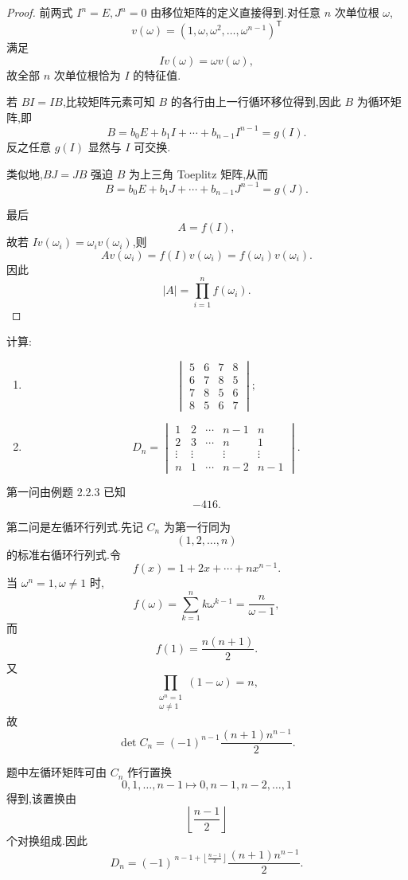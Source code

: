 \begin{proof}
前两式 $I^n=E,J^n=0$ 由移位矩阵的定义直接得到.对任意 $n$ 次单位根 $\omega$,
\[
v(\omega)
=
(1,\omega,\omega^2,\ldots,\omega^{n-1})^{\mathsf T}
\]
满足
\[
Iv(\omega)=\omega v(\omega),
\]
故全部 $n$ 次单位根恰为 $I$ 的特征值.

若 $BI=IB$,比较矩阵元素可知 $B$ 的各行由上一行循环移位得到,因此 $B$ 为循环矩阵,即
\[
B=b_0E+b_1I+\cdots+b_{n-1}I^{n-1}=g(I).
\]
反之任意 $g(I)$ 显然与 $I$ 可交换.

类似地,$BJ=JB$ 强迫 $B$ 为上三角 Toeplitz 矩阵,从而
\[
B=b_0E+b_1J+\cdots+b_{n-1}J^{n-1}=g(J).
\]

最后
\[
A=f(I),
\]
故若 $Iv(\omega_i)=\omega_i v(\omega_i)$,则
\[
Av(\omega_i)
=
f(I)v(\omega_i)
=
f(\omega_i)v(\omega_i).
\]
因此
\[
|A|
=
\prod\limits_{i=1}^{n}f(\omega_i).
\]
\end{proof}


\begin{example}
计算:
\begin{enumerate}
  \item
  \[
  \begin{vmatrix}
  5&6&7&8\\
  6&7&8&5\\
  7&8&5&6\\
  8&5&6&7
  \end{vmatrix};
  \]
  \item
  \[
  D_n=
  \begin{vmatrix}
  1&2&\cdots&n-1&n\\
  2&3&\cdots&n&1\\
  \vdots&\vdots&&\vdots&\vdots\\
  n&1&\cdots&n-2&n-1
  \end{vmatrix}.
  \]
\end{enumerate}
\end{example}
\exampleblank

\begin{solution}
第一问由例题 2.2.3 已知
\[
\boxed{-416}.
\]

第二问是左循环行列式.先记 $C_n$ 为第一行同为
\[
(1,2,\ldots,n)
\]
的标准右循环行列式.令
\[
f(x)=1+2x+\cdots+nx^{n-1}.
\]
当 $\omega^n=1,\omega\neq1$ 时,
\[
f(\omega)
=
\sum\limits_{k=1}^{n}k\omega^{k-1}
=
\dfrac{n}{\omega-1},
\]
而
\[
f(1)=\dfrac{n(n+1)}{2}.
\]
又
\[
\displaystyle\prod_{\substack{\omega^n=1\\\omega\neq1}}(1-\omega)=n,
\]
故
\[
\det C_n
=
(-1)^{n-1}
\dfrac{(n+1)n^{n-1}}{2}.
\]

题中左循环矩阵可由 $C_n$ 作行置换
\[
0,1,\ldots,n-1
\longmapsto
0,n-1,n-2,\ldots,1
\]
得到,该置换由
\[
\left\lfloor\dfrac{n-1}{2}\right\rfloor
\]
个对换组成.因此
\[
\boxed{
D_n
=
(-1)^{\,n-1+\left\lfloor\frac{n-1}{2}\right\rfloor}
\dfrac{(n+1)n^{n-1}}{2}
}.
\]
\end{solution}


